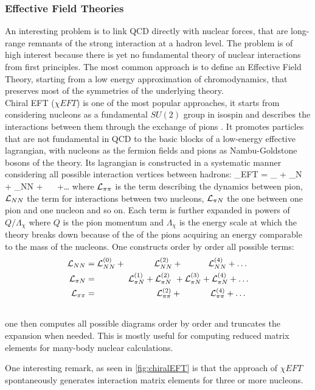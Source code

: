 \subsubsection{Effective Field Theories}
An interesting problem is to link QCD directly with nuclear forces, that are long-range remnants of the strong interaction at a hadron level. The problem is of high interest because there is yet no fundamental theory of nuclear interactions from first principles. The most common approach is to define an Effective Field Theory, starting from a low energy approximation of chromodynamics, that preserves most of the symmetries of the underlying theory. \\
Chiral EFT ($\chi EFT$) is one of the most popular approaches, it starts from considering nucleons as a fundamental $SU(2)$ group in isospin and describes the interactions between them through the exchange of pions \cite{machleidt_chiral_2016}. It promotes particles that are not fundamental in QCD to the basic blocks of a low-energy effective lagrangian, with nucleons as the fermion fields and pions as Nambu-Goldstone bosons of the theory. Its lagrangian is constructed in a systematic manner considering all possible interaction vertices between hadrons:
\beq
    \Lagr_{\chi EFT} = \Lagr_{\pi\pi} +  \Lagr_{\pi N} + \Lagr_{NN} + ~ ~+\dots
\eeq 
where $\mathcal{L}_{\pi\pi}$ is the term describing the dynamics between pion, $\mathcal{L}_{NN}$ the term for interactions between two nucleons, $\mathcal{L}_{\pi N}$ the one between one pion and one nucleon and so on. Each term is further expanded in powers of $Q/\Lambda_\chi$ where $Q$ is the pion momentum and $\Lambda_\chi$ is the energy scale at which the theory breaks down because of the of the pions acquiring an energy comparable to the mass of the nucleons. One constructs order by order all possible terms:
\begin{align}
    \mathcal{L}_{NN} &= \mathcal{L}_{NN}^{(0)} + ~~~~~~~~~~  \mathcal{L}_{NN}^{(2)} + ~~~~~~~~~  \mathcal{L}_{NN}^{(4)} + \dots\\\nonumber
    \mathcal{L}_{\pi N} &= ~~~~~~~~~~~ \mathcal{L}_{\pi N}^{(1)} + \mathcal{L}_{\pi N}^{(2)} ~+  \mathcal{L}_{\pi N}^{(3)} + \mathcal{L}_{\pi N}^{(4)} + \dots  \\\nonumber
    \mathcal{L}_{\pi \pi} &= ~~~~~~~~~~~~~~~~~~~~~ \mathcal{L}_{\pi \pi}^{(2)} +  ~~~~~~~~~~  \mathcal{L}_{\pi \pi}^{(4)} + \dots  \\\nonumber
\end{align} 
one then computes all possible diagrams order by order and truncates the expansion when needed. This is mostly useful for computing reduced matrix elements for many-body nuclear calculations. 

One interesting remark, as seen in \cref{fig:chiralEFT} is that the approach of $\chi EFT$ spontaneously generates interaction matrix elements for three or more nucleons. 